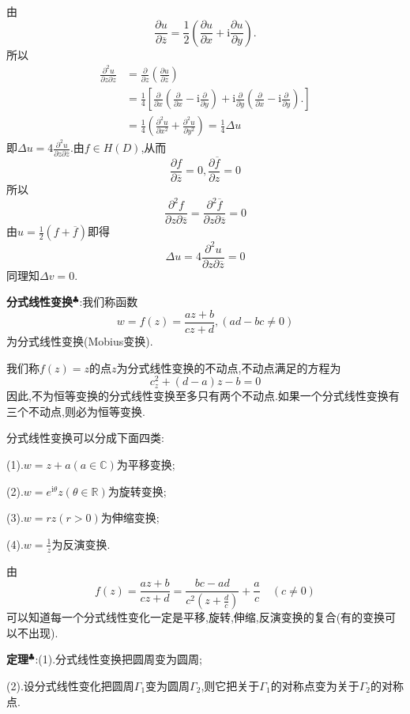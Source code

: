 由
$$
\frac{\partial u}{\partial \overline{z}}=\frac{1}{2}\left(\frac{\partial u}{\partial x}+\mathrm{i}\frac{\partial u}{\partial y}\right).
$$
所以
$$
\begin{aligned}
    \frac{\partial^2 u}{\partial z\partial \overline{z}}&= \frac{\partial }{\partial z}\left(\frac{\partial u}{\partial \overline{z}}\right)\\
                                                        &= \frac{1}{4}\left[\frac{\partial}{\partial x}\left(\frac{\partial}{\partial x}-\mathrm{i}\frac{\partial}{\partial y}\right)+\mathrm{i}\frac{\partial}{\partial y}\left(\frac{\partial}{\partial x}-\mathrm{i}\frac{\partial}{\partial y}\right).\right]\\
                                                        &= \frac{1}{4}\left(\frac{\partial ^2u}{\partial x^2}+\frac{\partial ^2u}{\partial y^2}\right)=\frac{1}{4}\Delta u
\end{aligned}
$$
即$\Delta u=4\frac{\partial^2 u}{\partial z\partial \overline{z}}$.由$f\in H(D)$,从而
$$
\frac{\partial f}{\partial \overline{z}}=0,\frac{\partial\overline{f}}{\partial z}=0
$$
所以
$$
\frac{\partial^2 f}{\partial z\partial \overline{z}}=\frac{\partial^2 \overline{f}}{\partial z\partial \overline{z}}=0
$$
由$u=\frac{1}{2}(f+\overline{f})$即得
$$
\Delta u=4\frac{\partial^2 u}{\partial z\partial \overline{z}}=0
$$
同理知$\Delta v=0$.\par
\textbf{分式线性变换}$^\clubsuit $:我们称函数
$$
w=f(z)=\frac{az+b}{cz+d},(ad-bc\neq 0)
$$
为分式线性变换(Mobius变换).\par
我们称$f(z)=z$的点$z$为分式线性变换的不动点,不动点满足的方程为
$$
c_z^2+(d-a)z-b=0
$$
因此,不为恒等变换的分式线性变换至多只有两个不动点.如果一个分式线性变换有三个不动点,则必为恒等变换.\par
分式线性变换可以分成下面四类:\par
(1).$w=z+a(a\in\mathbb{C})$为平移变换;\par
(2).$w=e^{\mathrm{i}\theta}z(\theta\in\mathbb{R})$为旋转变换;\par
(3).$w=rz(r>0)$为伸缩变换;\par
(4).$w=\frac{1}{z}$为反演变换.\par
由
$$
f(z)=\frac{az+b}{cz+d}=\frac{bc-ad}{c^2\left(z+\frac{d}{c}\right)}+\frac{a}{c}\quad (c\neq 0)
$$
可以知道每一个分式线性变化一定是平移,旋转,伸缩,反演变换的复合(有的变换可以不出现).\par
\textbf{定理}$^\clubsuit $:(1).分式线性变换把圆周变为圆周;\par
\qquad \quad (2).设分式线性变化把圆周$\Gamma_1$变为圆周$\Gamma_2$,则它把关于$\Gamma_1$的对称点变为关于$\Gamma_2$的对称点.\par
